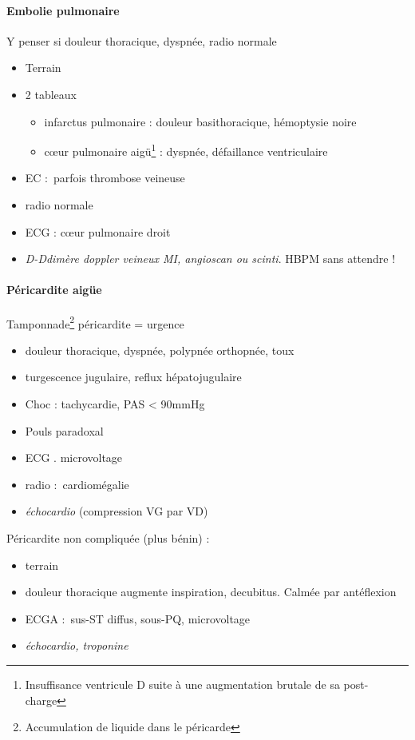 \paragraph{Embolie pulmonaire} Y penser si douleur thoracique, dyspnée, radio
normale \skull
\begin{itemize}
  \item Terrain
  \item 2 tableaux
    \begin{itemize}
      \item infarctus pulmonaire : douleur basithoracique, hémoptysie noire
      \item c\oe{}ur pulmonaire aigü\footnote{Insuffisance ventricule D suite à
          une augmentation brutale de sa post-charge} : dyspnée, défaillance ventriculaire
    \end{itemize}
  \item EC : parfois thrombose veineuse
  \item radio normale
  \item ECG : c\oe{}ur pulmonaire droit
  \item \textit{D-Ddimère \thus doppler veineux MI, angioscan ou scinti}. HBPM sans
    attendre !
\end{itemize}

\paragraph{Péricardite aigüe}
Tamponnade\footnote{Accumulation de liquide dans le péricarde} péricardite = urgence \skull
\begin{itemize}
  \item douleur thoracique, dyspnée, polypnée \thus orthopnée, toux
  \item turgescence jugulaire, reflux hépatojugulaire
  \item Choc : tachycardie, PAS < 90mmHg
  \item Pouls paradoxal
  \item ECG . microvoltage
  \item radio : cardiomégalie
  \item \textit{échocardio}  (compression VG par VD)
\end{itemize}

Péricardite non compliquée (plus bénin) :
\begin{itemize}
  \item terrain
  \item douleur thoracique augmente inspiration, decubitus. Calmée par
    antéflexion
  \item ECGA : sus-ST diffus, sous-PQ, microvoltage
  \item \textit{échocardio, troponine} 
\end{itemize}

